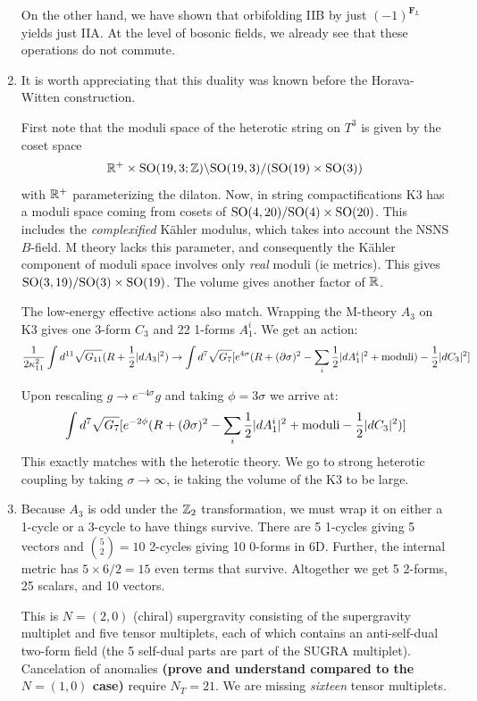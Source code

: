 \documentclass[11pt, class=article, crop=false]{standalone}
\begin{document}
\begin{enumerate}
	On the other hand, we have shown that orbifolding IIB by just $(-1)^{\mathbf{F}_L}$ yields just IIA. At the level of bosonic fields, we already see that these operations do not commute. 
	
	\item It is worth appreciating that this duality was known before the Horava-Witten construction.
	
	First note that the moduli space of the heterotic string on $T^3$ is given by the coset space 
	\[
		\mathbb{R}^+ \times \mathrm{SO}(19,3;\mathbb{Z})\backslash \mathrm{SO}(19,3)/(\mathrm{SO}(19) \times \mathrm{SO}(3))
	\]
	with $\mathbb{R}^+$ parameterizing the dilaton. Now, in string compactifications K3 has a moduli space coming from cosets of $\mathrm{SO}(4, 20)/\mathrm{SO}(4) \times \mathrm{SO}(20)$. This includes the \emph{complexified} K\"ahler modulus, which takes into account the NSNS $B$-field. M theory lacks this parameter, and consequently the K\"ahler component of moduli space involves only \emph{real} moduli (ie metrics). This gives $\mathrm{SO}(3, 19)/\mathrm{SO}(3) \times \mathrm{SO}(19)$. The volume gives another factor of $\mathbb{R}$.
	
	The low-energy effective actions also match. Wrapping the M-theory $A_3$ on K3 gives one 3-form $C_3$ and 22 1-forms $A_1^i$. We get an action:
	\[
		\frac{1}{2 \kappa_{11}^2}\int d^{11} \sqrt{G_{11}} (R + \frac12 |dA_3|^2)  \to \int   d^{7} \sqrt{G_{7}} [e^{4 \sigma} (R + (\partial \sigma)^2 - \sum_i \frac12 |dA_1^i|^2  + \text{moduli} ) - \frac12 |dC_3|^2]
	\]
	
	Upon rescaling $g \to e^{-4\sigma} g$ and taking $\phi = 3 \sigma$ we arrive at:
	\[
		\int   d^{7} \sqrt{G_{7}} [e^{-2 \phi} (R + (\partial \sigma)^2 - \sum_i \frac12 |dA_1^i|^2  + \text{moduli} - \frac12 |dC_3|^2) ]
	\]
	This exactly matches with the heterotic theory. We go to strong heterotic coupling by taking $\sigma \to \infty$, ie taking the volume of the K3 to be large. 
	
	
	\item
	 Because $A_3$ is odd under the $\mathbb{Z}_2$ transformation, we must wrap it on either a 1-cycle or a 3-cycle to have things survive. There are 5 1-cycles giving 5 vectors and ${5 \choose 2} = 10$ 2-cycles giving 10 $0$-forms in 6D. Further, the internal metric has $5 \times 6/2 = 15$ even terms that survive. Altogether we get 5 2-forms, 25 scalars, and 10 vectors. 
	
	This is $N=(2,0)$ (chiral) supergravity consisting of the supergravity multiplet and five tensor multiplets, each of which contains an anti-self-dual two-form field (the 5 self-dual parts are part of the SUGRA multiplet). Cancelation of anomalies \textbf{(prove and understand compared to the $N = (1,0)$ case)} require $N_T = 21$. We are missing \emph{sixteen} tensor multiplets.  
	

\end{enumerate}
\end{document}

